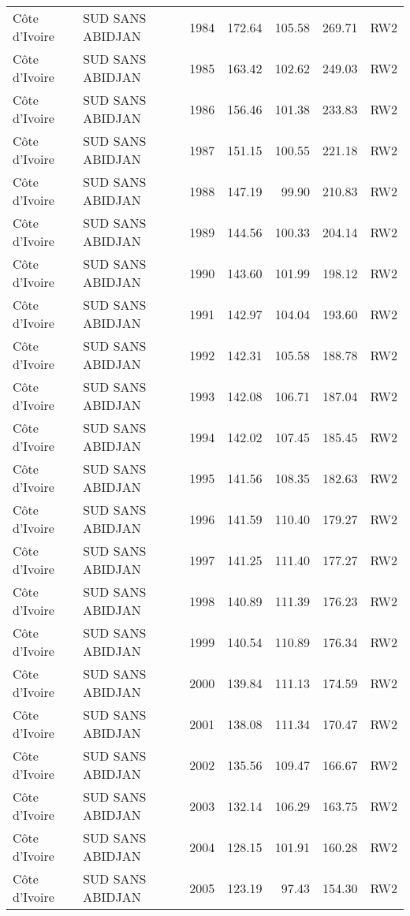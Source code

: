 \begin{longtable}{lllrrrl}
  C\^{o}te d'Ivoire & SUD SANS ABIDJAN & 1984 & 172.64 & 105.58 & 269.71 & RW2 \\ 
  C\^{o}te d'Ivoire & SUD SANS ABIDJAN & 1985 & 163.42 & 102.62 & 249.03 & RW2 \\ 
  C\^{o}te d'Ivoire & SUD SANS ABIDJAN & 1986 & 156.46 & 101.38 & 233.83 & RW2 \\ 
  C\^{o}te d'Ivoire & SUD SANS ABIDJAN & 1987 & 151.15 & 100.55 & 221.18 & RW2 \\ 
  C\^{o}te d'Ivoire & SUD SANS ABIDJAN & 1988 & 147.19 & 99.90 & 210.83 & RW2 \\ 
  C\^{o}te d'Ivoire & SUD SANS ABIDJAN & 1989 & 144.56 & 100.33 & 204.14 & RW2 \\ 
  C\^{o}te d'Ivoire & SUD SANS ABIDJAN & 1990 & 143.60 & 101.99 & 198.12 & RW2 \\ 
  C\^{o}te d'Ivoire & SUD SANS ABIDJAN & 1991 & 142.97 & 104.04 & 193.60 & RW2 \\ 
  C\^{o}te d'Ivoire & SUD SANS ABIDJAN & 1992 & 142.31 & 105.58 & 188.78 & RW2 \\ 
  C\^{o}te d'Ivoire & SUD SANS ABIDJAN & 1993 & 142.08 & 106.71 & 187.04 & RW2 \\ 
  C\^{o}te d'Ivoire & SUD SANS ABIDJAN & 1994 & 142.02 & 107.45 & 185.45 & RW2 \\ 
  C\^{o}te d'Ivoire & SUD SANS ABIDJAN & 1995 & 141.56 & 108.35 & 182.63 & RW2 \\ 
  C\^{o}te d'Ivoire & SUD SANS ABIDJAN & 1996 & 141.59 & 110.40 & 179.27 & RW2 \\ 
  C\^{o}te d'Ivoire & SUD SANS ABIDJAN & 1997 & 141.25 & 111.40 & 177.27 & RW2 \\ 
  C\^{o}te d'Ivoire & SUD SANS ABIDJAN & 1998 & 140.89 & 111.39 & 176.23 & RW2 \\ 
  C\^{o}te d'Ivoire & SUD SANS ABIDJAN & 1999 & 140.54 & 110.89 & 176.34 & RW2 \\ 
  C\^{o}te d'Ivoire & SUD SANS ABIDJAN & 2000 & 139.84 & 111.13 & 174.59 & RW2 \\ 
  C\^{o}te d'Ivoire & SUD SANS ABIDJAN & 2001 & 138.08 & 111.34 & 170.47 & RW2 \\ 
  C\^{o}te d'Ivoire & SUD SANS ABIDJAN & 2002 & 135.56 & 109.47 & 166.67 & RW2 \\ 
  C\^{o}te d'Ivoire & SUD SANS ABIDJAN & 2003 & 132.14 & 106.29 & 163.75 & RW2 \\ 
  C\^{o}te d'Ivoire & SUD SANS ABIDJAN & 2004 & 128.15 & 101.91 & 160.28 & RW2 \\ 
  C\^{o}te d'Ivoire & SUD SANS ABIDJAN & 2005 & 123.19 & 97.43 & 154.30 & RW2 \\ 

\end{longtable}
